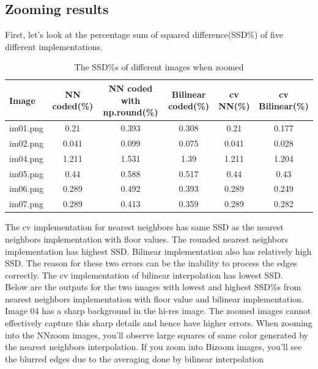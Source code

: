 \documentclass[11pt, a4paper]{article}
\begin{document}
\subsection{Zooming results}
First, let's look at the percentage sum of squared difference(SSD\%) of five different implementations.
\begin{table}[H]
\begin{tabular}{|l | c | c | c | c | c|}
\hline
Image &NN coded(\%) &NN coded with np.round(\%) &Bilinear coded(\%) &cv NN(\%) &cv Bilinear(\%)\\
\hline
im01.png &0.21 &0.393 &0.308 &0.21 &0.177\\
im02.png &0.041 &0.099 &0.075 &0.041 &0.028\\
im04.png &1.211 &1.531 &1.39 &1.211 &1.204\\
im05.png &0.44 &0.588 &0.517 &0.44 &0.43\\
im06.png &0.289 &0.492 &0.393 &0.289 &0.249\\
im07.png &0.289 &0.413 &0.359 &0.289 &0.282\\
\hline
\end{tabular}
\caption{The SSD\%s of different images when zoomed}
\end{table}
The cv implementation for nearest neighbors has same SSD as the nearest neighbors implementation with floor values. The rounded nearest neighbors implementation has highest SSD. Bilinear implementation also has relatively high SSD. The reason for these two errors can be the inability to process the edges correctly. The cv implementation of bilinear interpolation has lowest SSD.\\
Below are the outputs for the two images with lowest and highest SSD\%s from nearest neighbors implementation with floor value and bilinear implementation. Image 04 has a sharp background in the hi-res image. The zoomed images cannot effectively capture this sharp details and hence have higher errors. When zooming into the NNzoom images, you'll observe large squares of same color generated by the nearest neighbors interpolation. If you zoom into Bizoom images, you'll see the blurred edges due to the averaging done by bilinear interpolation
\end{document}
